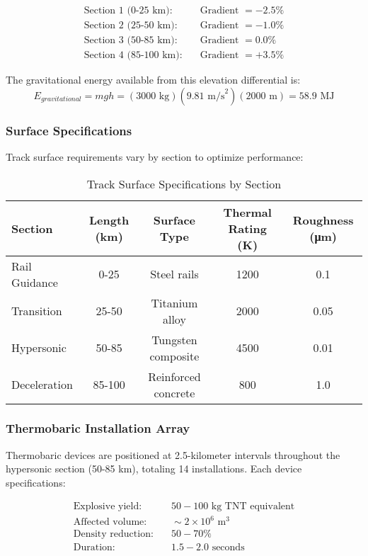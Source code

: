 \documentclass[12pt,a4paper]{article}
\begin{document}
\begin{align}
\text{Section 1 (0-25 km):} &\quad \text{Gradient } = -2.5\% \\
\text{Section 2 (25-50 km):} &\quad \text{Gradient } = -1.0\% \\
\text{Section 3 (50-85 km):} &\quad \text{Gradient } = 0.0\% \\
\text{Section 4 (85-100 km):} &\quad \text{Gradient } = +3.5\%
\end{align}

The gravitational energy available from this elevation differential is:
\begin{equation}
E_{gravitational} = mgh = (3000 \text{ kg})(9.81 \text{ m/s}^2)(2000 \text{ m}) = 58.9 \text{ MJ}
\label{eq:gravitational_energy}
\end{equation}

\subsubsection{Surface Specifications}
Track surface requirements vary by section to optimize performance:

\begin{table}[H]
\centering
\caption{Track Surface Specifications by Section}
\label{tab:track_specifications}
\begin{tabular}{lcccc}
\toprule
Section & Length (km) & Surface Type & Thermal Rating (K) & Roughness (μm) \\
\midrule
Rail Guidance & 0-25 & Steel rails & 1200 & 0.1 \\
Transition & 25-50 & Titanium alloy & 2000 & 0.05 \\
Hypersonic & 50-85 & Tungsten composite & 4500 & 0.01 \\
Deceleration & 85-100 & Reinforced concrete & 800 & 1.0 \\
\bottomrule
\end{tabular}
\end{table}

\subsubsection{Thermobaric Installation Array}
Thermobaric devices are positioned at 2.5-kilometer intervals throughout the hypersonic section (50-85 km), totaling 14 installations. Each device specifications:

\begin{align}
\text{Explosive yield:} &\quad 50-100 \text{ kg TNT equivalent} \\
\text{Affected volume:} &\quad \sim 2 \times 10^6 \text{ m}^3 \\
\text{Density reduction:} &\quad 50-70\% \\
\text{Duration:} &\quad 1.5-2.0 \text{ seconds}
\end{align}
\end{document}
